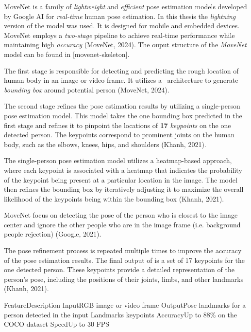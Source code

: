 MoveNet is a family of {\em lightweight} and {\em efficient} pose estimation models developed by Google AI for {\em real-time} human pose estimation. In this thesis the {\em lightning} version of the model was used. It is designed for mobile and embedded devices. MoveNet employs a {\em two-stage} pipeline to achieve real-time performance while maintaining high {\em accuracy} (\scc MoveNet, 2024). The ouput structure of the {\em MoveNet} model can be found in [movenet-skeleton].

The first stage is responsible for detecting and predicting the rough location of human body in an image or video frame. It utilizes a \SSD\ architecture to generate {\em bounding box} around potential person (\scc MoveNet, 2024).

The second stage refines the pose estimation results by utilizing a single-person pose estimation model. This model takes the one bounding box predicted in the first stage and refines it to pinpoint the locations of {\bf 17} {\em keypoints} on the one detected person. The keypoints correspond to prominent joints on the human body, such as the elbows, knees, hips, and shoulders (\scc Khanh, 2021).

The single-person pose estimation model utilizes a heatmap-based approach, where each keypoint is associated with a heatmap that indicates the probability of the keypoint being present at a particular location in the image. The model then refines the bounding box by iteratively adjusting it to maximize the overall likelihood of the keypoints being within the bounding box (\scc Khanh, 2021).

MoveNet focus on detecting the pose of the person who is closest to the image center and ignore the other people who are in the image frame (i.e. background people rejection) (\scc Google, 2021).

The pose refinement process is repeated multiple times to improve the accuracy of the pose estimation results. The final output of is a set of 17 keypoints for the one detected person. These keypoints provide a detailed representation of the person's pose, including the positions of their joints, limbs, and other landmarks (\scc Khanh, 2021).

    \setupTABLE[r][1][style=bold]
    \setupTABLE[c][each][offset=3dd]
    \setupTABLE[frame=off]
    \setupTABLE[r][1][topframe=on,bottomframe=on]
    \setupTABLE[c][each][leftframe=on]
    \setupTABLE[c][1][leftframe=off]
    \bTR
        \bTD Feature\eTD\bTD    Description\eTD\eTR
    \bTR
        \bTD Input\eTD\bTD	    RGB image or video frame\eTD\eTR
    \bTR
        \bTD Output\eTD\bTD	    Pose landmarks for a person detected in the input\eTD\eTR
    \bTR
        \bTD Landmarks\eTD{} keypoints\eTD\eTR
    \bTR
        \bTD Accuracy\eTD\bTD   Up to 88\% on the COCO dataset\eTD\eTR
    \bTR
        \bTD Speed\eTD\bTD	    Up to 30 FPS\eTD\eTR

